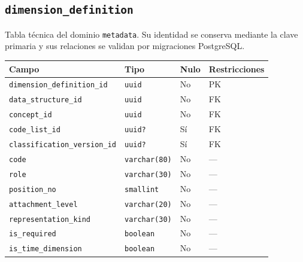 \documentclass[11pt]{article}
\begin{document}
\subsection{\texttt{dimension\_definition}}
Tabla técnica del dominio \texttt{metadata}. Su identidad se conserva mediante la clave primaria y sus relaciones se validan por migraciones PostgreSQL.
\begin{longtable}{>{\raggedright\arraybackslash}p{} p{} p{} p{}}
\toprule Campo & Tipo & Nulo & Restricciones \\ \midrule\endhead
\texttt{dimension\_definition\_id} & \texttt{uuid} & No & PK \\
\texttt{data\_structure\_id} & \texttt{uuid} & No & FK \\
\texttt{concept\_id} & \texttt{uuid} & No & FK \\
\texttt{code\_list\_id} & \texttt{uuid?} & Sí & FK \\
\texttt{classification\_version\_id} & \texttt{uuid?} & Sí & FK \\
\texttt{code} & \texttt{varchar(80)} & No & --- \\
\texttt{role} & \texttt{varchar(30)} & No & --- \\
\texttt{position\_no} & \texttt{smallint} & No & --- \\
\texttt{attachment\_level} & \texttt{varchar(20)} & No & --- \\
\texttt{representation\_kind} & \texttt{varchar(30)} & No & --- \\
\texttt{is\_required} & \texttt{boolean} & No & --- \\
\texttt{is\_time\_dimension} & \texttt{boolean} & No & --- \\
\bottomrule\end{longtable}
\end{document}

